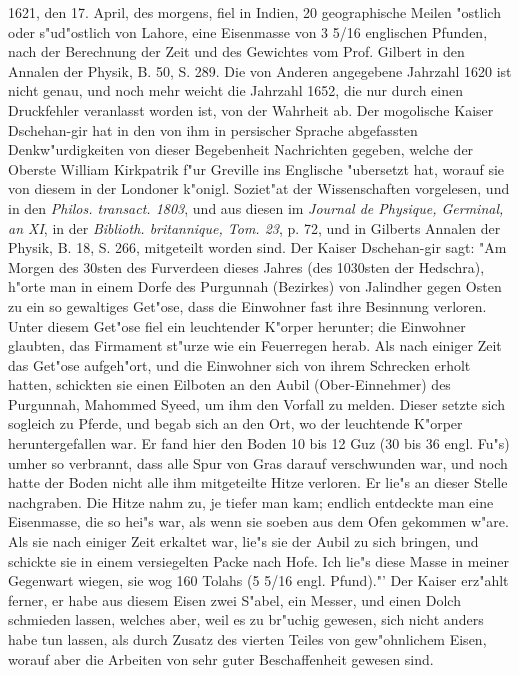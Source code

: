 \documentclass[a4paper, 11pt, oneside, polutonikogreek, german]{article}
\begin{document}
1621, den 17. April, des morgens, fiel in Indien, 20 geographische Meilen "ostlich oder s"ud"ostlich von Lahore, eine Eisenmasse von 3 5/16 englischen Pfunden, nach der Berechnung der Zeit und des Gewichtes vom Prof. Gilbert in den Annalen der Physik, B. 50, S. 289. Die von Anderen angegebene Jahrzahl 1620 ist nicht genau, und noch mehr weicht die Jahrzahl 1652, die nur durch einen Druckfehler veranlasst worden ist, von der Wahrheit ab. Der mogolische Kaiser Dschehan-gir hat in den von ihm in persischer Sprache abgefassten Denkw"urdigkeiten von dieser Begebenheit Nachrichten gegeben, welche der Oberste William Kirkpatrik f"ur Greville ins Englische "ubersetzt hat, worauf sie von diesem in der Londoner k"onigl. Soziet"at der Wissenschaften vorgelesen, und in den \emph{Philos. transact. 1803}, und aus diesen im \emph{Journal de Physique, Germinal, an XI}, in der \emph{Biblioth. britannique, Tom. 23}, p. 72, und in Gilberts Annalen der Physik, B. 18, S. 266, mitgeteilt worden sind. Der Kaiser Dschehan-gir sagt: "Am Morgen des 30sten des Furverdeen dieses Jahres (des 1030sten der Hedschra), h"orte man in einem Dorfe des Purgunnah (Bezirkes) von Jalindher gegen Osten zu ein so gewaltiges Get"ose, dass die Einwohner fast ihre Besinnung verloren. Unter diesem Get"ose fiel ein leuchtender K"orper herunter; die Einwohner glaubten, das Firmament st"urze wie ein Feuerregen herab. Als nach einiger Zeit das Get"ose aufgeh"ort, und die Einwohner sich von ihrem Schrecken erholt hatten, schickten sie einen Eilboten an den Aubil (Ober-Einnehmer) des Purgunnah, Mahommed Syeed, um ihm den Vorfall zu melden. Dieser setzte sich sogleich zu Pferde, und begab sich an den Ort, wo der leuchtende K"orper heruntergefallen war. Er fand hier den Boden 10 bis 12 Guz (30 bis 36 engl. Fu"s) umher so verbrannt, dass alle Spur von Gras darauf verschwunden war, und noch hatte der Boden nicht alle ihm mitgeteilte Hitze verloren. Er lie"s an dieser Stelle nachgraben. Die Hitze nahm zu, je tiefer man kam; endlich entdeckte man eine Eisenmasse, die so hei"s war, als wenn sie soeben aus dem Ofen gekommen w"are. Als sie nach einiger Zeit erkaltet war, lie"s sie der Aubil zu sich bringen, und schickte sie in einem versiegelten Packe nach Hofe. Ich lie"s diese Masse in meiner Gegenwart wiegen, sie wog 160 Tolahs (5 5/16 engl. Pfund)."' Der Kaiser erz"ahlt ferner, er habe aus diesem Eisen zwei S"abel, ein Messer, und einen Dolch schmieden lassen, welches aber, weil es zu br"uchig gewesen, sich nicht anders habe tun lassen, als durch Zusatz des vierten Teiles von gew"ohnlichem Eisen, worauf aber die Arbeiten von sehr guter Beschaffenheit gewesen sind.
\end{document}
